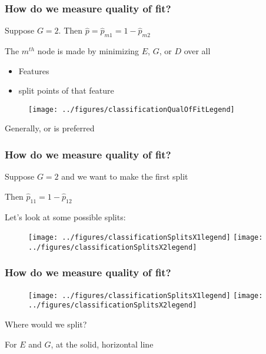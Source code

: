 \documentclass[12pt]{beamer}
\begin{document}
\begin{frame}[fragile]
\frametitle{How do we measure quality of fit?}
 Suppose $G = 2$. Then $\hat p = \hat p_{m1} = 1-\hat p_{m2}$

\vsp
The $m^{th}$ node is made by minimizing $E$, $G$, or $D$ over all 
\begin{itemize}
\item Features
\item split points of that feature
\end{itemize}


\begin{figure}
\centering
\texttt{[image: ../figures/classificationQualOfFitLegend]}
\end{figure}
Generally,  or  is preferred

\end{frame}



\begin{frame}[fragile]
\frametitle{How do we measure quality of fit?}
 Suppose $G = 2$ and we want to make the first split

\vsp
Then $\hat p_{11} = 1-\hat p_{12}$


\vsp
Let's look at some possible splits:
\begin{figure}
\centering
\texttt{[image: ../figures/classificationSplitsX1legend]} 
\texttt{[image: ../figures/classificationSplitsX2legend]}
\end{figure}
\end{frame}

\begin{frame}[fragile]
\frametitle{How do we measure quality of fit?}
\begin{figure}
\centering
\texttt{[image: ../figures/classificationSplitsX1legend]} 
\texttt{[image: ../figures/classificationSplitsX2legend]}
\end{figure}
Where would we split?
\pause
\vsp

For $E$ and $G$, at the solid, horizontal line  

\end{frame}
\end{document}
